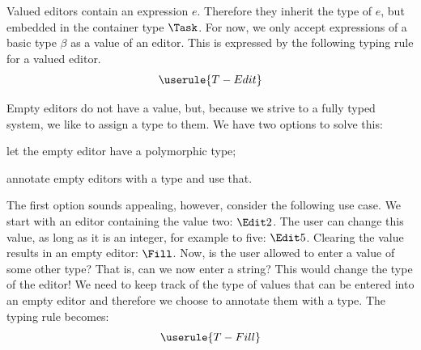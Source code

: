 Valued editors contain an expression $e$.
Therefore they inherit the type of $e$,
but embedded in the container type $\Task$.
For now, we only accept expressions of a basic type $\beta$ as a value of an editor.
This is expressed by the following typing rule for a valued editor.
\begin{equation*}
  \userule{T-Edit}
\end{equation*}

Empty editors do not have a value,
but, because we strive to a fully typed system,
we like to assign a type to them.
We have two options to solve this:
\begin{enumerate*}
  \item let the empty editor have a polymorphic type;
  \item annotate empty editors with a type and use that.
\end{enumerate*}
The first option sounds appealing, however, consider the following use case.
We start with an editor containing the value two: $\Edit 2$.
The user can change this value, as long as it is an integer,
for example to five: $\Edit 5$.
Clearing the value results in an empty editor: $\Fill$.
Now, is the user allowed to enter a value of some other type?
That is, can we now enter a string?
This would change the type of the editor!
We need to keep track of the type of values that can be entered into an empty editor
and therefore we choose to annotate them with a type.
The typing rule becomes:
\begin{equation*}
  \userule{T-Fill}
\end{equation*}

